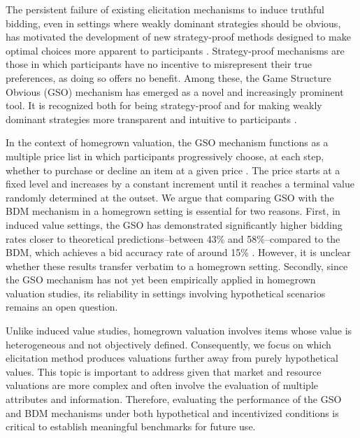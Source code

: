 \documentclass[12pt]{article}
\begin{document}
The persistent failure of existing elicitation mechanisms to induce truthful bidding, even in settings where weakly dominant strategies should be obvious, has motivated the development of new strategy-proof methods designed to make optimal choices more apparent to participants \citep{li_obviously_2017, pycia_theory_2023}. Strategy-proof mechanisms are those in which participants have no incentive to misrepresent their true preferences, as doing so offers no benefit. Among these, the Game Structure Obvious (GSO) mechanism has emerged as a novel and increasingly prominent tool. It is recognized both for being strategy-proof and for making weakly dominant strategies more transparent and intuitive to participants \citep{chakraborty_future_2025}. 

In the context of homegrown valuation, the GSO mechanism functions as a multiple price list in which participants progressively choose, at each step, whether to purchase or decline an item at a given price \citep{yu2021multiple, herberich2012digging, jack2022multiple}.  The price starts at a fixed level and increases by a constant increment until it reaches a terminal value randomly determined at the outset. We argue that comparing GSO with the BDM mechanism in a homegrown setting is essential for two reasons. First, in induced value settings, the GSO  has demonstrated significantly higher bidding rates closer to theoretical predictions--between 43\% and 58\%--compared to the BDM, which achieves a bid accuracy rate of around 15\% \citep{chakraborty_future_2025}. However, it is unclear whether these results transfer verbatim to a homegrown setting. Secondly, since the GSO mechanism has not yet been empirically applied in homegrown valuation studies, its reliability in settings involving hypothetical scenarios remains an open question.

Unlike induced value studies, homegrown valuation involves items whose value is heterogeneous and not objectively defined. Consequently, we focus on which elicitation method produces valuations further away from purely hypothetical values.  This topic is important to address given that market and resource valuations are more complex and often involve the evaluation of multiple attributes and information.  Therefore, evaluating the performance of the GSO and BDM mechanisms under both hypothetical and incentivized conditions is critical to establish meaningful benchmarks for future use. 
\end{document}
